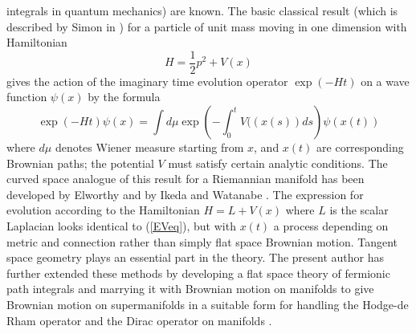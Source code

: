\documentclass[a4paper,fleqn,12pt]{article}
\newcommand{\half}{\frac12}
\begin{document}
integrals in quantum mechanics) are known. The basic classical
result (which is described by Simon in \cite{Simon}) for a
particle of unit mass moving in one dimension with Hamiltonian
 \begin{equation}
  H = \half p^2 + V(x)
 \end{equation}
gives the action of the imaginary time  evolution
operator $\exp(-Ht)$ on a wave function $\psi(x)$ by the formula
 \begin{equation}\label{EVeq}
   \exp (-Ht) \psi(x)
  = \int d\mu \exp \left( -\int_0^t V((x(s)) ds \right) \psi(x(t))
 \end{equation}
where $d\mu$ denotes Wiener measure starting from $x$, and $x(t)$
are corresponding Brownian paths; the potential $V$ must satisfy
certain analytic conditions. The curved space analogue of this
result for a Riemannian manifold has been developed by Elworthy
\cite{Elwort} and by Ikeda and Watanabe \cite{IkeWat}. The
expression for evolution according to the Hamiltonian $H= L +V(x)$
where $L$ is the scalar Laplacian looks identical to (\ref{EVeq}),
but with $x(t)$ a process depending on metric and connection
rather than simply flat space Brownian motion. Tangent space
geometry plays an essential part in the theory. The present author
has further extended these methods  by developing a flat space
theory of fermionic path integrals \cite{GBM} and marrying it with
Brownian motion on manifolds to give Brownian motion on
supermanifolds in a suitable form for handling  the Hodge-de Rham
operator and the Dirac operator on manifolds \cite{SCSTWO,JMPFI}.
%
\end{document}

